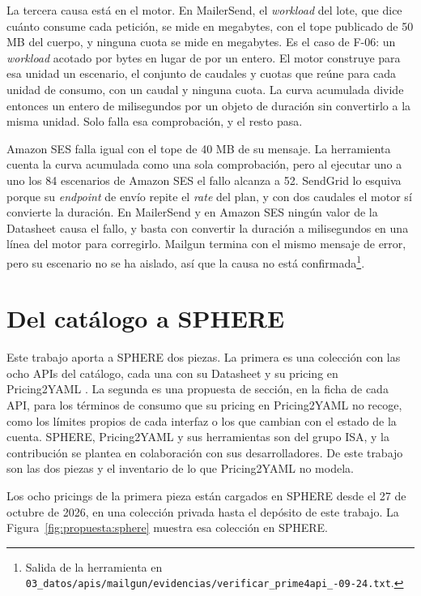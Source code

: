La tercera causa está en el motor.
En MailerSend, el \textit{workload} del lote, que dice cuánto consume cada petición, se mide en megabytes, con el tope publicado de 50 MB del cuerpo, y ninguna cuota se mide en megabytes.
Es el caso de F-06: un \textit{workload} acotado por bytes en lugar de por un entero.
El motor construye para esa unidad un escenario, el conjunto de caudales y cuotas que reúne para cada unidad de consumo, con un caudal y ninguna cuota.
La curva acumulada divide entonces un entero de milisegundos por un objeto de duración sin convertirlo a la misma unidad.
Solo falla esa comprobación, y el resto pasa.

Amazon SES falla igual con el tope de 40 MB de su mensaje.
La herramienta cuenta la curva acumulada como una sola comprobación, pero al ejecutar uno a uno los 84 escenarios de Amazon SES el fallo alcanza a 52.
SendGrid lo esquiva porque su \textit{endpoint} de envío repite el \textit{rate} del plan, y con dos caudales el motor sí convierte la duración.
En MailerSend y en Amazon SES ningún valor de la Datasheet causa el fallo, y basta con convertir la duración a milisegundos en una línea del motor para corregirlo.
Mailgun termina con el mismo mensaje de error, pero su escenario no se ha aislado, así que la causa no está confirmada\footnote{Salida de la herramienta en \texttt{03\_datos/\allowbreak apis/\allowbreak mailgun/\allowbreak evidencias/\allowbreak verificar\_prime4api\_-09-24.txt}.}.

\section{Del catálogo a SPHERE}
\label{sec:propuesta:sphere}

Este trabajo aporta a SPHERE dos piezas.
La primera es una colección con las ocho APIs del catálogo, cada una con su Datasheet y su pricing en Pricing2YAML \citep{garciafernandez2025trends}.
La segunda es una propuesta de sección, en la ficha de cada API, para los términos de consumo que su pricing en Pricing2YAML no recoge, como los límites propios de cada interfaz o los que cambian con el estado de la cuenta.
SPHERE, Pricing2YAML y sus herramientas son del grupo ISA, y la contribución se plantea en colaboración con sus desarrolladores.
De este trabajo son las dos piezas y el inventario de lo que Pricing2YAML no modela.

Los ocho pricings de la primera pieza están cargados en SPHERE desde el 27 de octubre de 2026, en una colección privada hasta el depósito de este trabajo.
La Figura~\ref{fig:propuesta:sphere} muestra esa colección en SPHERE.


